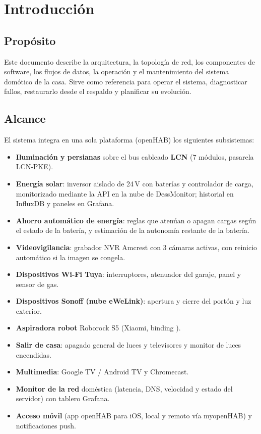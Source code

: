 \documentclass[11pt,a4paper]{report}
\newcommand{\code}[1]{\texttt{\detokenize{#1}}}
\begin{document}
\tableofcontents

\chapter{Introducción}

\section{Propósito}
Este documento describe la arquitectura, la topología de red, los componentes de software, los flujos de
datos, la operación y el mantenimiento del sistema domótico de la casa. Sirve como referencia para
operar el sistema, diagnosticar fallos, restaurarlo desde el respaldo y planificar su evolución.

\section{Alcance}
El sistema integra en una sola plataforma (openHAB) los siguientes subsistemas:
\begin{itemize}[nosep]
  \item \textbf{Iluminación y persianas} sobre el bus cableado \textbf{LCN} (7 módulos, pasarela LCN-PKE).
  \item \textbf{Energía solar}: inversor aislado de 24\,V con baterías y controlador de carga, monitorizado
        mediante la API en la nube de DessMonitor; historial en InfluxDB y paneles en Grafana.
  \item \textbf{Ahorro automático de energía}: reglas que atenúan o apagan cargas según el estado de la batería,
        y estimación de la autonomía restante de la batería.
  \item \textbf{Videovigilancia}: grabador NVR Amcrest con 3 cámaras activas, con reinicio automático si la
        imagen se congela.
  \item \textbf{Dispositivos Wi-Fi Tuya}: interruptores, atenuador del garaje, panel y sensor de gas.
  \item \textbf{Dispositivos Sonoff (nube eWeLink)}: apertura y cierre del portón y luz exterior.
  \item \textbf{Aspiradora robot} Roborock S5 (Xiaomi, binding \code{miio}).
  \item \textbf{Salir de casa}: apagado general de luces y televisores y monitor de luces encendidas.
  \item \textbf{Multimedia}: Google TV / Android TV y Chromecast.
  \item \textbf{Monitor de la red} doméstica (latencia, DNS, velocidad y estado del servidor) con tablero Grafana.
  \item \textbf{Acceso móvil} (app openHAB para iOS, local y remoto vía myopenHAB) y notificaciones push.
\end{itemize}
\end{document}
